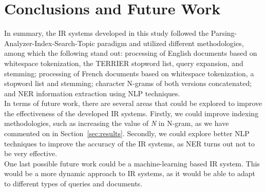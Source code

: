 \section{Conclusions and Future Work}
\label{sec:conclusion}

In summary, the IR systems developed in this study followed the Parsing-Analyzer-Index-Search-Topic paradigm and utilized different methodologies, among which the following stand out: processing of English documents based on whitespace tokenization, the TERRIER stopword list, query expansion, and stemming; processing of French documents based on whitespace tokenization, a stopword list and stemming; character N-grams of both versions concatenated; and NER information extraction using NLP techniques.\\

In terms of future work, there are several areas that could be explored to improve the effectiveness of the developed IR systems. Firstly, we could improve indexing methodologies, such as increasing the value of \textit{N} in N-gram, as we have commented on in Section~\ref{sec:results}. Secondly, we could explore better NLP techniques to improve the accuracy of the IR systems, as NER turns out not to be very effective.\\

One last possible future work could be a machine-learning based IR system. This would be a more dynamic approach to IR systems, as it would be able to adapt to different types of queries and documents.